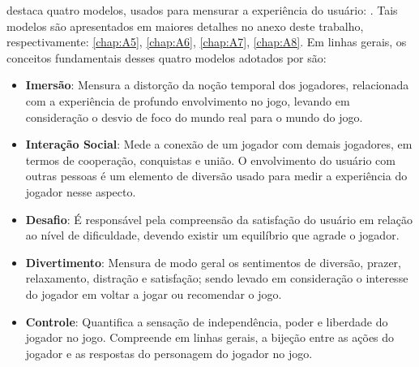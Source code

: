  destaca quatro modelos, usados para mensurar a experiência do usuário: . Tais modelos são apresentados em maiores detalhes no anexo deste trabalho, respectivamente: \autoref{chap:A5}, \ref{chap:A6}, \ref{chap:A7}, \ref{chap:A8}. Em linhas gerais, os conceitos fundamentais desses quatro modelos adotados por  são: 

\begin{itemize}[label={},leftmargin=2em]
\item \textbf{Imersão}: Mensura a distorção da noção temporal dos jogadores, relacionada com a experiência de profundo envolvimento no jogo, levando em consideração o desvio de foco do mundo real para o mundo do jogo.
\end{itemize}

\begin{itemize}[label={},leftmargin=2em]
\item \textbf{Interação Social}: Mede a conexão de um jogador com demais jogadores, em termos de cooperação, conquistas e união. O envolvimento do usuário com outras pessoas é um elemento de diversão usado para medir a experiência do jogador nesse aspecto. 
\end{itemize}

\begin{itemize}[label={},leftmargin=2em]
\item \textbf{Desafio}: É responsável pela compreensão da satisfação do usuário em relação ao nível de dificuldade, devendo existir um equilíbrio que agrade o jogador.
\end{itemize}

\begin{itemize}[label={},leftmargin=2em]
\item \textbf{Divertimento}: Mensura de modo geral os sentimentos de diversão, prazer, relaxamento, distração e satisfação; sendo levado em consideração o interesse do jogador em voltar a jogar ou recomendar o jogo.
\end{itemize}

\begin{itemize}[label={},leftmargin=2em]
\item \textbf{Controle}: Quantifica a sensação de independência, poder e liberdade do jogador no jogo. Compreende em linhas gerais, a bijeção entre as ações do jogador e as respostas do personagem do jogador no jogo. 
\end{itemize}

